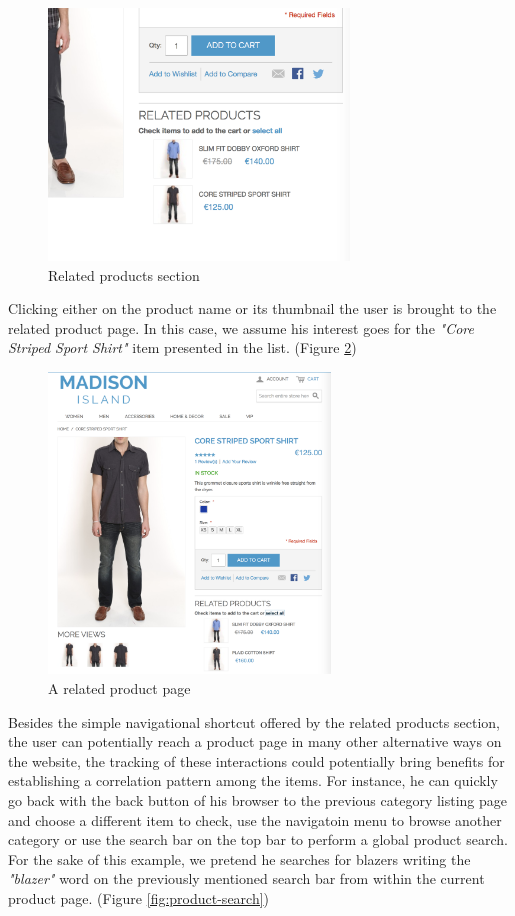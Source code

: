 \vspace{0.5cm}
\begin{figure}[H]
  \centering
    \includegraphics[width=8cm]{images/madison/related-products.png}
  \caption{Related products section}
  \label{fig:related-products}
\end{figure}
\vspace{0.5cm}

Clicking either on the product name or its thumbnail the user is brought to the related product page. In this case, we assume his interest goes for the \textit{"Core Striped Sport Shirt"} item presented in the list. (Figure \ref{fig:product-detail2})

\vspace{0.5cm}
\begin{figure}[H]
  \centering
    \includegraphics[height=8cm]{images/madison/product-detail2.png}
  \caption{A related product page}
  \label{fig:product-detail2}
\end{figure}
\vspace{0.5cm}

Besides the simple navigational shortcut offered by the related products section, the user can potentially reach a product page in many other alternative ways on the website, the tracking of these interactions could potentially bring benefits for establishing a correlation pattern among the items.  For instance, he can quickly go back with the back button of his browser to the previous category listing page and choose a different item to check, use the navigatoin menu to browse another category or use the search bar on the top bar to perform a global product search. For the sake of this example, we pretend he searches for blazers writing the \textit{"blazer"} word on the previously mentioned search bar from within the current product page. (Figure \ref{fig:product-search})

